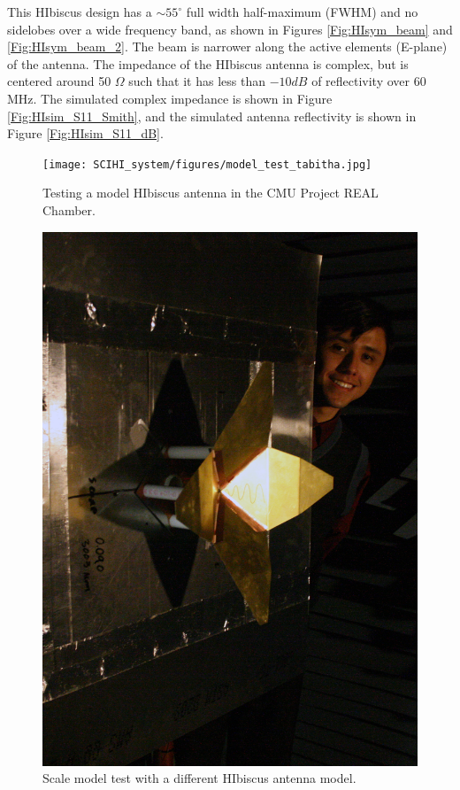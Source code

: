This HIbiscus design has a $\sim 55^\circ$ full width half-maximum (FWHM) and no sidelobes over a wide frequency band, as shown in Figures \ref{Fig:HIsym_beam} and \ref{Fig:HIsym_beam_2}. The beam is narrower along the active elements (E-plane) of the antenna. The impedance of the HIbiscus antenna is complex, but is centered around 50 $\Omega$ such that it has less than $-10 dB$ of reflectivity over 60 MHz. The simulated complex impedance is shown in Figure \ref{Fig:HIsim_S11_Smith}, and the simulated antenna reflectivity is shown in Figure \ref{Fig:HIsim_S11_dB}. 

\begin{figure}[htb]
\centering
\begin{minipage}[b]{0.50\textwidth}
\centering
\texttt{[image: SCIHI\_system/figures/model\_test\_tabitha.jpg]}
\caption{Testing a model HIbiscus antenna in the CMU Project REAL Chamber. }
\label{Fig:hibiscus_scale_tabitha}
\end{minipage}%
\begin{minipage}[b]{0.02\textwidth}
\hspace{1cm}
\end{minipage}%
\begin{minipage}[b]{0.44\textwidth}
\centering
\includegraphics[width=0.95\linewidth]{SCIHI_system/figures/model_test_jose.jpg}
\caption{Scale model test with a different HIbiscus antenna model.}
\label{Fig:hibiscus_scale_jose}
\end{minipage}
\end{figure}
 
